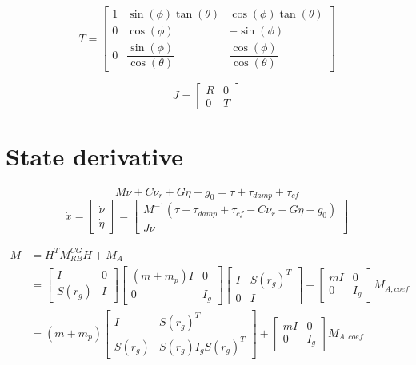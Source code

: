 \documentclass[12pt,a4]{article}
\begin{document}
\begin{equation}
	T =
	\begin{bmatrix}
		1 & \sin(\phi)\tan(\theta)           & \cos(\phi)\tan(\theta)           \\
		0 & \cos(\phi)                       & -\sin(\phi)                      \\
		0 & \dfrac{\sin(\phi)}{\cos(\theta)} & \dfrac{\cos(\phi)}{\cos(\theta)}
	\end{bmatrix}
\end{equation}

\begin{equation}
	J = \begin{bmatrix}
		R & 0 \\
		0 & T
	\end{bmatrix}
\end{equation}

\section{State derivative}
\begin{equation}
	M \dot{\nu} + C \nu_r + G \eta + g_0 = \tau + \tau_{damp} + \tau_{cf}
\end{equation}
\begin{equation}
	\dot{x} =
	\begin{bmatrix}\dot{\nu}\\\dot{\eta}\end{bmatrix}
	=
	\begin{bmatrix}
		M^{-1}(\tau + \tau_{damp} + \tau_{cf} - C  \nu_r - G  \eta - g_0) \\
		J \nu
	\end{bmatrix}
\end{equation}


\begin{align}
	M & = H^T M_{RB}^{CG} H + M_A \\
	  & =
	\begin{bmatrix} I & 0 \\ S(r_g)  & I \end{bmatrix}
	\begin{bmatrix}
		(m+m_p)I & 0   \\
		0        & I_g
	\end{bmatrix}
	\begin{bmatrix} I & S(r_g)^T\\ 0  & I \end{bmatrix}
	+
	\begin{bmatrix}
		mI & 0   \\
		0  & I_g
	\end{bmatrix}
	M_{A,coef}                    \\
	  & =
	(m+m_p)
	\begin{bmatrix}
		I      & S(r_g)^T            \\
		S(r_g) & S(r_g) I_g S(r_g)^T
	\end{bmatrix}
	+
	\begin{bmatrix}
		mI & 0   \\
		0  & I_g
	\end{bmatrix}
	M_{A,coef}
\end{align}
\end{document}

